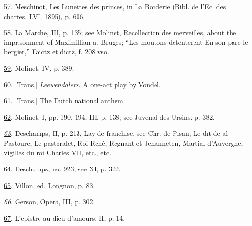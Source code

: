 \protect\hypertarget{23_NOTES.xhtmlux5cux23id_1376}{\protect\hyperlink{11_Chapter_Four__THE_FORMS_OF_LOVE.xhtmlux5cux23id_1375}{57}}.
Meschinot, Les Lunettes des princes, in La Borderie (Bibl. de l'Ec. des
chartes, LVI, 1895), p. 606.

\protect\hypertarget{23_NOTES.xhtmlux5cux23id_1374}{\protect\hyperlink{11_Chapter_Four__THE_FORMS_OF_LOVE.xhtmlux5cux23id_1373}{58}}.
La Marche, III, p. 135; see Molinet, Recollection des merveilles, about
the imprisonment of Maximillian at Bruges; ``Les moutons detenterent En
son parc le bergier,'' Faictz et dictz, f. 208 vso.

\protect\hypertarget{23_NOTES.xhtmlux5cux23id_1372}{\protect\hyperlink{11_Chapter_Four__THE_FORMS_OF_LOVE.xhtmlux5cux23id_1371}{59}}.
Molinet, IV, p. 389.

\protect\hypertarget{23_NOTES.xhtmlux5cux23id_1370}{\protect\hyperlink{11_Chapter_Four__THE_FORMS_OF_LOVE.xhtmlux5cux23id_1369}{60}}.
{[}Trans.{]} \emph{Leewendalers}. A one-act play by Vondel.

\protect\hypertarget{23_NOTES.xhtmlux5cux23id_1368}{\protect\hyperlink{11_Chapter_Four__THE_FORMS_OF_LOVE.xhtmlux5cux23id_1367}{61}}.
{[}Trans.{]} The Dutch national anthem.

\protect\hypertarget{23_NOTES.xhtmlux5cux23id_1366}{\protect\hyperlink{11_Chapter_Four__THE_FORMS_OF_LOVE.xhtmlux5cux23id_1365}{62}}.
Molinet, I, pp. 190, 194; III, p. 138; see Juvenal des Ursins. p. 382.

\emph{\protect\hypertarget{23_NOTES.xhtmlux5cux23id_1364}{\protect\hyperlink{11_Chapter_Four__THE_FORMS_OF_LOVE.xhtmlux5cux23id_1363}{63}}}.
Deschamps, II, p. 213, Lay de franchise, see Chr. de Pisan, Le dit de al
Pastoure, Le pastoralet, Roi René, Regnant et Jehanneton, Martial
d'Auvergne, vigilles du roi Charles VII, etc., etc.

\protect\hypertarget{23_NOTES.xhtmlux5cux23id_1362}{\protect\hyperlink{11_Chapter_Four__THE_FORMS_OF_LOVE.xhtmlux5cux23id_1361}{64}}.
Deschamps, no. 923, see XI, p. 322.

\protect\hypertarget{23_NOTES.xhtmlux5cux23id_1360}{\protect\hyperlink{11_Chapter_Four__THE_FORMS_OF_LOVE.xhtmlux5cux23id_1359}{65}}.
Villon, ed. Longnon, p. 83.

\emph{\protect\hypertarget{23_NOTES.xhtmlux5cux23id_1358}{\protect\hyperlink{11_Chapter_Four__THE_FORMS_OF_LOVE.xhtmlux5cux23id_1357}{66}}}.
Gerson, Opera, III, p. 302.

\protect\hypertarget{23_NOTES.xhtmlux5cux23id_1356}{\protect\hyperlink{11_Chapter_Four__THE_FORMS_OF_LOVE.xhtmlux5cux23id_1355}{67}}.
L'epistre au dieu d'amours, II, p. 14.

